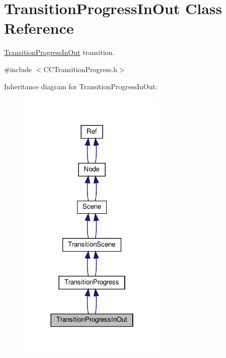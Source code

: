\hypertarget{classTransitionProgressInOut}{}\section{Transition\+Progress\+In\+Out Class Reference}
\label{classTransitionProgressInOut}


\hyperlink{classTransitionProgressInOut}{Transition\+Progress\+In\+Out} transition.  




{\ttfamily \#include $<$C\+C\+Transition\+Progress.\+h$>$}



Inheritance diagram for Transition\+Progress\+In\+Out\+:
\nopagebreak
\begin{figure}[H]
\begin{center}
\leavevmode
\includegraphics[width=202pt]{classTransitionProgressInOut__inherit__graph}
\end{center}
\end{figure}


